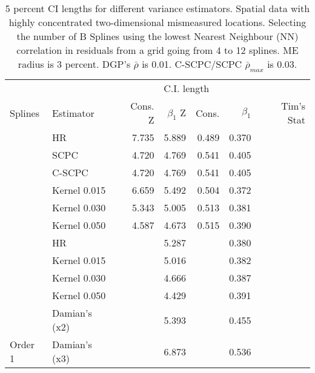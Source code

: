 \documentclass[
]{article}
\begin{document}
\hypertarget{tbl-lights-me-true-rho-below}{}
\begin{longtable}[t]{llrrrrr}
\caption{\label{tbl-lights-me-true-rho-below}5 percent CI lengths for different variance estimators. Spatial data
with highly concentrated two-dimensional mismeasured locations.
Selecting the number of B Splines using the lowest Nearest Neighbour
(NN) correlation in residuals from a grid going from 4 to 12 splines. ME
radius is 3 percent. DGP's \(\bar\rho\) is 0.01. C-SCPC/SCPC
\(\bar\rho_{max}\) is 0.03. }\tabularnewline

\toprule
\multicolumn{2}{c}{ } & \multicolumn{4}{c}{C.I. length} \\
\cmidrule(l{3pt}r{3pt}){3-6}
Splines & Estimator & Cons. Z & $\beta_1$ Z & Cons. & $\beta_1$ & Tim's Stat\\
\midrule
 & HR & 7.735 & 5.889 & 0.489 & 0.370 & \\

 & SCPC & 4.720 & 4.769 & 0.541 & 0.405 & \\

 & C-SCPC & 4.720 & 4.769 & 0.541 & 0.405 & \\

 & Kernel 0.015 & 6.659 & 5.492 & 0.504 & 0.372 & \\

 & Kernel 0.030 & 5.343 & 5.005 & 0.513 & 0.381 & \\

\multirow[t]{-6}{*}{\raggedright\arraybackslash } & Kernel 0.050 & 4.587 & 4.673 & 0.515 & 0.390 & \multirow[t]{-6}{*}{\raggedleft\arraybackslash 125.744}\\
\cmidrule{1-7}
 & HR &  & 5.287 &  & 0.380 & \\

 & Kernel 0.015 &  & 5.016 &  & 0.382 & \\

 & Kernel 0.030 &  & 4.666 &  & 0.387 & \\

 & Kernel 0.050 &  & 4.429 &  & 0.391 & \\

 & Damian's (x2) &  & 5.393 &  & 0.455 & \\

\multirow[t]{-6}{*}{\raggedright\arraybackslash Order 1} & Damian's (x3) &  & 6.873 &  & 0.536 & \multirow[t]{-6}{*}{\raggedleft\arraybackslash 7.284}\\
\bottomrule
\end{longtable}
\end{document}
